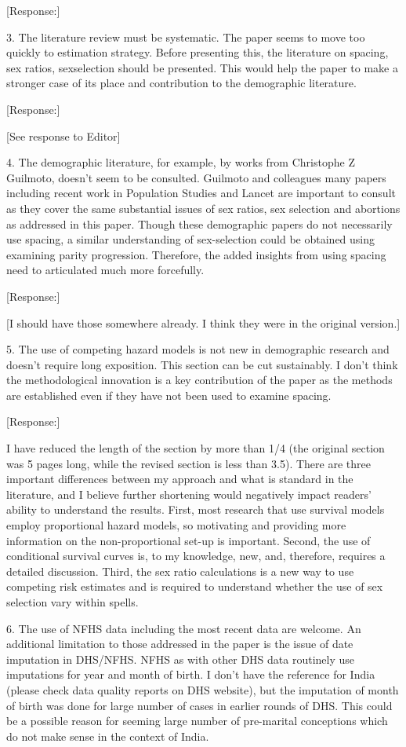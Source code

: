 \documentclass[letterpaper,12pt]{article}
\begin{document}
[Response:]

3. The literature review must be systematic. The paper seems to move too
quickly to estimation strategy. Before presenting this, the literature
on spacing, sex ratios, sexselection should be presented. This would
help the paper to make a stronger case of its place and contribution to
the demographic literature.

[Response:]

[See response to Editor]


4. The demographic literature, for example, by works from Christophe Z
Guilmoto, doesn’t seem to be consulted. Guilmoto and colleagues many
papers including recent work in Population Studies and Lancet are
important to consult as they cover the same substantial issues of sex
ratios, sex selection and abortions as addressed in this paper. Though
these demographic papers do not necessarily use spacing, a similar
understanding of sex-selection could be obtained using examining parity
progression. Therefore, the added insights from using spacing need to
articulated much more forcefully.

[Response:]

[I should have those somewhere already. I think they were in the original version.]

5. The use of competing hazard models is not new in demographic research
and doesn’t require long exposition. This section can be cut
sustainably. I don’t think the methodological innovation is a key
contribution of the paper as the methods are established even if they
have not been used to examine spacing.

[Response:]

I have reduced the length of the section by more than 1/4 (the original section was 5
pages long, while the revised section is less than 3.5).
There are three important differences between my approach and what is standard
in the literature, and I believe further shortening would negatively impact readers'
ability to understand the results.
First, most research that use survival models employ proportional hazard models, so 
motivating and providing more information on the non-proportional set-up is important.
Second, the use of conditional survival curves is, to my knowledge, new, and, therefore,
requires a detailed discussion.
Third, the sex ratio calculations is a new way to use competing risk estimates and is 
required to understand whether the use of sex selection vary within spells.


6. The use of NFHS data including the most recent data are welcome. An
additional limitation to those addressed in the paper is the issue of
date imputation in DHS/NFHS. NFHS as with other DHS data routinely use
imputations for year and month of birth. I don’t have the reference for
India (please check data quality reports on DHS website), but the
imputation of month of birth was done for large number of cases in
earlier rounds of DHS. This could be a possible reason for seeming large
number of pre-marital conceptions which do not make sense in the context
of India.
\end{document}
